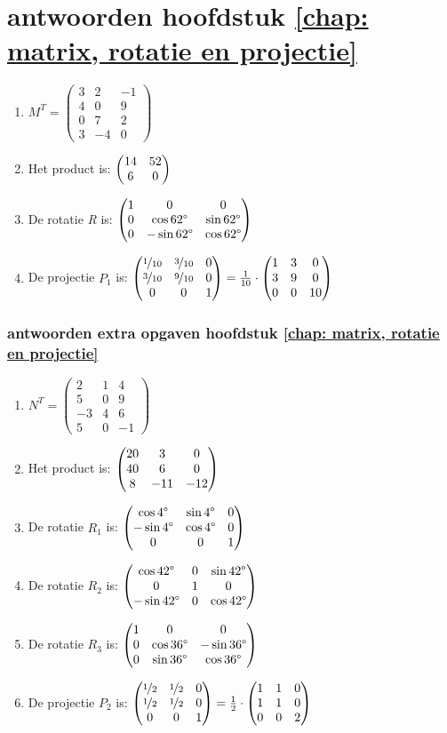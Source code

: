 \section{antwoorden  hoofdstuk \ref{chap: matrix, rotatie en projectie}}
\begin{enumerate}
	\item  
	$ M^{T} =	\begin{pmatrix}
	3 & 2 & -1\\
	4&0&9\\
	0&7&2\\
	3&-4&0 
	\end{pmatrix} $
	\item
	Het product is:  $ \begin{pmatrix} 14&52 \\ 6&0 \end{pmatrix}  $
	\item
	De rotatie \textit{R} is:  
	$ \begin{pmatrix} 1&0&0 \\ 0&\cos  62 \degree  & \sin 62 \degree \\ 0& -\sin 62 \degree & \cos 62 \degree \end{pmatrix}  $
	\item
	De projectie \textit{$P_1$} is:  
	$ \begin{pmatrix} \nicefrac{1}{10}&\nicefrac{3}{10}&0 \\ \nicefrac{3}{10}&\nicefrac{9}{10}  & 0 \\ 0& 0 & 1 \end{pmatrix}  
	= \frac{1}{10} \cdot\begin{pmatrix} 1&3&0 \\ 3&9  & 0 \\ 0& 0 & 10 \end{pmatrix} $    
	
\end{enumerate}

\subsubsection{antwoorden extra opgaven hoofdstuk \ref{chap: matrix, rotatie en projectie}}
\begin{enumerate}
	\item
	$ N^{T} =	\begin{pmatrix}
	2 & 1 & 4\\
	5&0&9\\
	-3&4&6\\
	5&0&-1 
	\end{pmatrix} $
	\item
	Het product is:  
	$ \begin{pmatrix} 20&3&0 \\ 40&6&0 \\ 8&-11&-12 \end{pmatrix} $
	\item    De rotatie   \textit{$ R_1  $}  is:  
	$ \begin{pmatrix} \cos  4 \degree  & \sin 4 \degree &0 \\  -\sin 4 \degree & \cos 4 \degree&0 \\ 0&0&1 \end{pmatrix} $
	\item De rotatie   \textit{$ R_2  $}  is:  
	$ \begin{pmatrix} \cos  42 \degree  & 0& \sin 42 \degree  \\ 0&1&0 \\  -\sin 42\degree &  0 &\cos 42 \degree \end{pmatrix} 
	$
	\item     De rotatie \textit{$ R_3  $} is:  
	$ \begin{pmatrix} 1&0&0 \\ 0&\cos  36 \degree  & -\sin 36 \degree \\ 0& \sin 36 \degree & \cos 36 \degree \end{pmatrix} $ \\
	\item   De projectie \textit{ $ P_2 $ } is:  
	$ \begin{pmatrix} \nicefrac{1}{2}&\nicefrac{1}{2}&0 \\ \nicefrac{1}{2}&\nicefrac{1}{2}  & 0 \\ 0& 0 & 1 \end{pmatrix}  
	= \frac{1}{2} \cdot\begin{pmatrix} 1&1&0 \\ 1& 1 & 0 \\ 0& 0 & 2 \end{pmatrix} $    
	
\end{enumerate}

